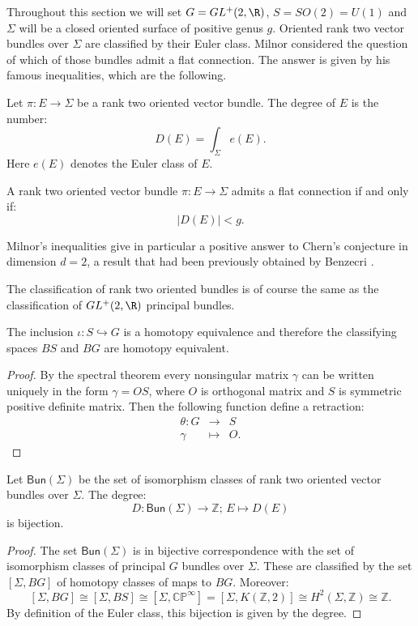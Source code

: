 Throughout this section we will set $G=GL^{+}(2,\R)$, $S=SO(2)=U(1)$ and $\Sigma$ will be a closed oriented surface of positive genus $g$. 
Oriented rank two vector bundles over $\Sigma$ are classified by their Euler class. Milnor considered the question
of which of those bundles admit a flat connection. The answer is given by his famous inequalities, which are the following. 

\begin{definition}
	Let $\pi: E \rightarrow \Sigma$ be a rank two oriented vector bundle. The degree of $E$ is the number:
	\[ D(E)= \int_\Sigma e(E).\]
	Here $e(E)$ denotes the Euler class of $E$.
\end{definition}

\begin{theoremnn}
	A rank two oriented vector bundle $\pi:E \rightarrow \Sigma$ admits a flat connection if and only if:
	\[ |D(E)|<g.\]
\end{theoremnn}



Milnor's inequalities give in particular a positive answer to Chern's conjecture in dimension $d=2$, a result that had been previously obtained by Benzecri \cite{B}.

The classification of rank two oriented bundles is of course the same as the classification of $GL^{+}(2,\R)$ principal bundles. 

\begin{lemma}
	The inclusion $\iota: S \hookrightarrow G$ is a homotopy equivalence and therefore the classifying spaces $BS$ and $BG$ are homotopy equivalent.
\end{lemma}
\begin{proof}
	By the spectral theorem every nonsingular matrix $\gamma$ can be written uniquely in the form $\gamma=OS$, where $O$ is orthogonal matrix and $S$ is symmetric positive definite matrix. Then the following function define a retraction:
	$$
	\begin{array}{rcc}
	\theta :G & \longrightarrow & S\\
	\gamma & \longmapsto & O.
	\end{array}
	$$
\end{proof}


\begin{lemma}
	Let $\mathsf{Bun}(\Sigma)$ be the set of isomorphism classes of rank two oriented vector bundles over $\Sigma$. The degree:
	\[D: \mathsf{Bun}(\Sigma) \rightarrow \mathbb{Z}; \, E \mapsto D(E)\]
	is bijection.
\end{lemma}
\begin{proof}
	The set $\mathsf{Bun}(\Sigma)$ is in bijective correspondence with the set of isomorphism classes of principal $G$ bundles over $\Sigma$. These are 
	classified by the set $[\Sigma, BG]$ of homotopy classes of maps to $BG$. Moreover:
	\[[\Sigma,BG]\cong[\Sigma,BS]\cong[\Sigma,\mathbb{CP}^{\infty}]=[\Sigma,K(\mathbb{Z},2)]\cong H^2(\Sigma,\mathbb{Z}) \cong \mathbb{Z}.\]
	By definition of the Euler class, this bijection is given by the degree.
\end{proof}


